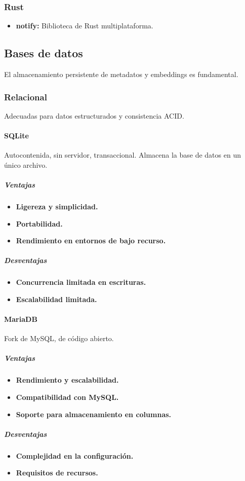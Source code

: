 \subsubsection{Rust}
\begin{itemize}
\item \textbf{notify:} Biblioteca de Rust multiplataforma.
\end{itemize}

\subsection{Bases de datos}
El almacenamiento persistente de metadatos y embeddings es fundamental.

\subsubsection{Relacional}
Adecuadas para datos estructurados y consistencia ACID.

\paragraph{SQLite}
Autocontenida, sin servidor, transaccional. Almacena la base de datos en un único archivo.
\subparagraph{Ventajas}
\begin{itemize}
    \item \textbf{Ligereza y simplicidad.}
    \item \textbf{Portabilidad.}
    \item \textbf{Rendimiento en entornos de bajo recurso.}
\end{itemize}
\subparagraph{Desventajas}
\begin{itemize}
    \item \textbf{Concurrencia limitada en escrituras.}
    \item \textbf{Escalabilidad limitada.}
\end{itemize}

\paragraph{MariaDB}
Fork de MySQL, de código abierto.
\subparagraph{Ventajas}
\begin{itemize}
    \item \textbf{Rendimiento y escalabilidad.}
    \item \textbf{Compatibilidad con MySQL.}
    \item \textbf{Soporte para almacenamiento en columnas.}
\end{itemize}
\subparagraph{Desventajas}
\begin{itemize}
    \item \textbf{Complejidad en la configuración.}
    \item \textbf{Requisitos de recursos.}
\end{itemize}

